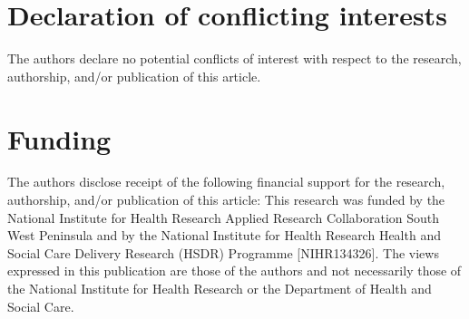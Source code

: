 \section{Declaration of conflicting interests}

The authors declare no potential conflicts of interest with respect to the research, authorship, and/or publication of this article. 

\section{Funding}

The authors disclose receipt of the following financial support for the research, authorship, and/or publication of this article: This research was funded by the National Institute for Health Research Applied Research Collaboration South West Peninsula and by the National Institute for Health Research Health and Social Care Delivery Research (HSDR) Programme [NIHR134326]. The views expressed in this publication are those of the authors and not necessarily those of the National Institute for Health Research or the Department of Health and Social Care. 